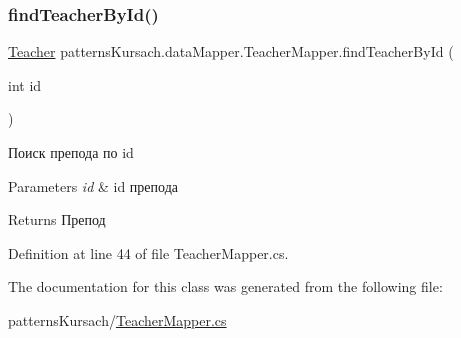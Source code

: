 \subsubsection{\texorpdfstring{find\+Teacher\+By\+Id()}{findTeacherById()}}
{\footnotesize\ttfamily \mbox{\hyperlink{classpatterns_kursach_1_1_teacher}{Teacher}} patterns\+Kursach.\+data\+Mapper.\+Teacher\+Mapper.\+find\+Teacher\+By\+Id (\begin{DoxyParamCaption}\item[{int}]{id }\end{DoxyParamCaption})}



Поиск препода по id 


\begin{DoxyParams}{Parameters}
{\em id} & id препода\\
\hline
\end{DoxyParams}
\begin{DoxyReturn}{Returns}
Препод
\end{DoxyReturn}


Definition at line 44 of file Teacher\+Mapper.\+cs.



The documentation for this class was generated from the following file\+:\begin{DoxyCompactItemize}
\item 
patterns\+Kursach/\mbox{\hyperlink{_teacher_mapper_8cs}{Teacher\+Mapper.\+cs}}\end{DoxyCompactItemize}
